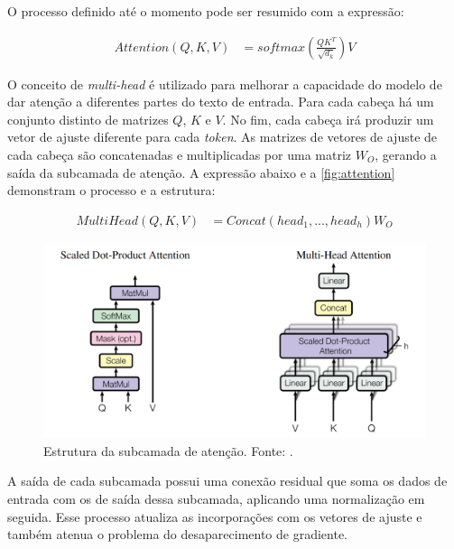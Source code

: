 O processo definido até o momento pode ser resumido com a expressão:

\begin{align*}
      Attention(Q, K, V) & = softmax({\frac{QK^T}{\sqrt{d_k}}})V
\end{align*}

O conceito de \textit{multi-head} é utilizado para melhorar a capacidade do modelo de dar atenção a diferentes partes do texto de entrada. Para cada cabeça há um
conjunto distinto de matrizes \begin{math}Q\end{math}, \begin{math}K\end{math} e \begin{math}V\end{math}. No fim, cada cabeça irá produzir um vetor de ajuste diferente
para cada \textit{token}. As matrizes de vetores de ajuste de cada cabeça são concatenadas e multiplicadas por uma matriz \begin{math}W_O\end{math}, gerando a saída da
subcamada de atenção. A expressão abaixo e a \autoref{fig:attention} demonstram o processo e a estrutura:

\begin{align*}
      MultiHead(Q, K, V) & = Concat(head_1,...,head_h)W_O
\end{align*}

\begin{figure}[ht]
      \centering
      \includegraphics[width=0.7\columnwidth,keepaspectratio]{images/attention.png}
      \caption{Estrutura da subcamada de atenção. Fonte: \textcite{transformer}.}
      \label{fig:attention}
\end{figure}

A saída de cada subcamada possui uma conexão residual que soma os dados de entrada com os de saída dessa subcamada, aplicando uma normalização em seguida. Esse processo
atualiza as incorporações com os vetores de ajuste e também atenua o problema do desaparecimento de gradiente.

